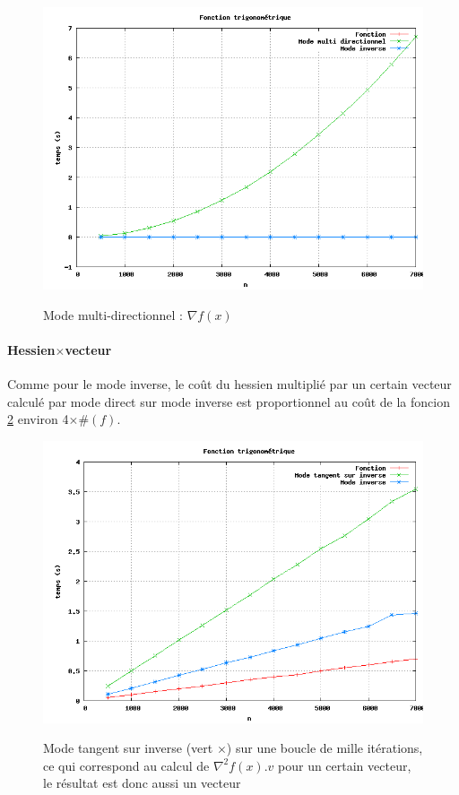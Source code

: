 \begin{figure}
\caption{Mode multi-directionnel : $\nabla f(x)$}
\center
\includegraphics[scale=0.4]{figures/temps4.png}
\label{fig:temps4}
\end{figure}


\paragraph{Hessien$\times$vecteur}

Comme pour le mode inverse, le coût du hessien multipli\'e par un certain vecteur calcul\'e par mode direct sur mode inverse est proportionnel
 au coût de la foncion \ref{fig:temps3} environ 4$\times\#(f)$.


\begin{figure}
\caption{Mode tangent sur inverse (vert $\times$) sur une boucle de mille it\'erations, ce qui correspond au calcul de $\nabla^2 f(x).v$ pour un certain vecteur, le r\'esultat
est donc aussi un vecteur}
\center
\includegraphics[scale=0.4]{figures/temps3.png}
\label{fig:temps3}
\end{figure}






